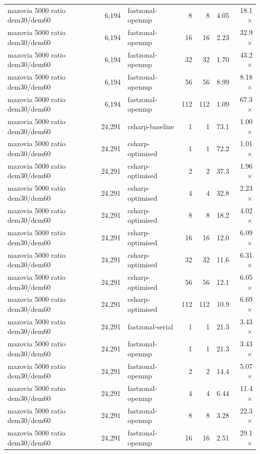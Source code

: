 \begin{tabular}{lrlrrrr}
mazovia 5000 ratio dem30/dem60 & 6,194 & fastzonal-openmp & 8 & 8 & 4.05 & 18.1$\times$ \\
mazovia 5000 ratio dem30/dem60 & 6,194 & fastzonal-openmp & 16 & 16 & 2.23 & 32.9$\times$ \\
mazovia 5000 ratio dem30/dem60 & 6,194 & fastzonal-openmp & 32 & 32 & 1.70 & 43.2$\times$ \\
mazovia 5000 ratio dem30/dem60 & 6,194 & fastzonal-openmp & 56 & 56 & 8.99 & 8.18$\times$ \\
mazovia 5000 ratio dem30/dem60 & 6,194 & fastzonal-openmp & 112 & 112 & 1.09 & 67.3$\times$ \\
mazovia 5000 ratio dem30/dem60 & 24,291 & csharp-baseline & 1 & 1 & 73.1 & 1.00$\times$ \\
mazovia 5000 ratio dem30/dem60 & 24,291 & csharp-optimised & 1 & 1 & 72.2 & 1.01$\times$ \\
mazovia 5000 ratio dem30/dem60 & 24,291 & csharp-optimised & 2 & 2 & 37.3 & 1.96$\times$ \\
mazovia 5000 ratio dem30/dem60 & 24,291 & csharp-optimised & 4 & 4 & 32.8 & 2.23$\times$ \\
mazovia 5000 ratio dem30/dem60 & 24,291 & csharp-optimised & 8 & 8 & 18.2 & 4.02$\times$ \\
mazovia 5000 ratio dem30/dem60 & 24,291 & csharp-optimised & 16 & 16 & 12.0 & 6.09$\times$ \\
mazovia 5000 ratio dem30/dem60 & 24,291 & csharp-optimised & 32 & 32 & 11.6 & 6.31$\times$ \\
mazovia 5000 ratio dem30/dem60 & 24,291 & csharp-optimised & 56 & 56 & 12.1 & 6.05$\times$ \\
mazovia 5000 ratio dem30/dem60 & 24,291 & csharp-optimised & 112 & 112 & 10.9 & 6.69$\times$ \\
mazovia 5000 ratio dem30/dem60 & 24,291 & fastzonal-serial & 1 & 1 & 21.3 & 3.43$\times$ \\
mazovia 5000 ratio dem30/dem60 & 24,291 & fastzonal-openmp & 1 & 1 & 21.3 & 3.43$\times$ \\
mazovia 5000 ratio dem30/dem60 & 24,291 & fastzonal-openmp & 2 & 2 & 14.4 & 5.07$\times$ \\
mazovia 5000 ratio dem30/dem60 & 24,291 & fastzonal-openmp & 4 & 4 & 6.44 & 11.4$\times$ \\
mazovia 5000 ratio dem30/dem60 & 24,291 & fastzonal-openmp & 8 & 8 & 3.28 & 22.3$\times$ \\
mazovia 5000 ratio dem30/dem60 & 24,291 & fastzonal-openmp & 16 & 16 & 2.51 & 29.1$\times$ \\

\end{tabular}
